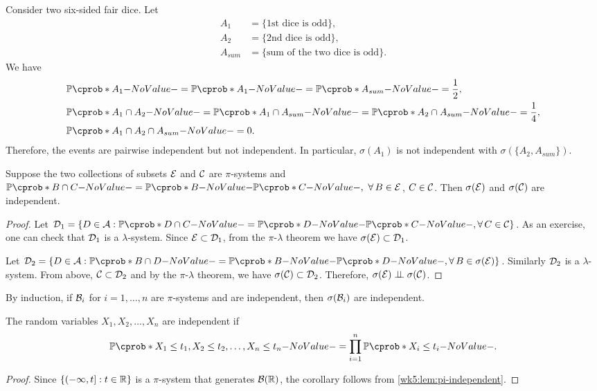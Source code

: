 \documentclass[12pt]{article}
\begin{document}
\begin{Example}\label{wk5:Independence2}
Consider two six-sided fair dice. Let
\begin{align*}
A_1 & =\{ \text{1st dice is odd} \}, \\
A_2 & =\{ \text{2nd dice is odd} \},\\
A_{sum} & =\{ \text{sum of the two dice is odd} \}.
\end{align*}
We have
\begin{align*}
&\P (A_1) =\P (A_1) =\P (A_{sum}) =\frac{1}{2},\\
&\P (A_1\cap A_2) =\P (A_1\cap A_{sum})=\P (A_2\cap A_{sum}) =\frac{1}{4},\\
&\P (A_1\cap A_2 \cap A_{sum}) =0.
\end{align*}
Therefore, the events are pairwise independent but not independent. In particular, $\sigma(A_1)$ is not independent with $\sigma(\{A_2,A_{sum}\})$.
\end{Example}

\begin{Lemma}\label{wk5:lem:pi-independent} 
Suppose the two collections of subsets $\mathcal{E}$ and $\mathcal{C}$ are $\pi$-systems and $\P(B \cap C)=\P(B) \P (C),\ \forall B \in \calE$, $C \in \mathcal{C}$. Then $\sigma (\mathcal{E})$ and $\sigma (\mathcal{C})$ are independent.
\end{Lemma}
\begin{proof}
Let $\calD_1=\{D \in \calA : \P (D\cap C)= \P(D) \P(C), \forall C \in \calC \}$. As an exercise, one can check that $\mathcal{D}_1$ is a $\lambda$-system. Since $\mathcal{E} \subset \mathcal{D}_1$, from the $\pi$-$\lambda$ theorem we have $\sigma(\mathcal{E})\subset \mathcal{D}_1$.

Let $\calD_2=\{D \in \calA : \P (B\cap D)= \P(B) \P(D), \forall B \in \sigma(\calE) \}$. Similarly $\mathcal{D}_2$ is a $\lambda$-system. From above, $\mathcal{C} \subset \mathcal{D}_2$ and by the $\pi$-$\lambda$ theorem, we have $\sigma(\mathcal{C})\subset \mathcal{D}_2$. Therefore, $\sigma (\calE) \independent \sigma (\calC)$.
\end{proof}
By induction, if $\mathcal{B}_i$ for $i=1,\ldots,n$ are $\pi$-systems and are independent, then $\sigma(\mathcal{B} _i)$ are independent.

\begin{Corollary}
The random variables $X_1,X_2,\ldots,X_n$ are independent if 
\begin{align*}
\P (X_1\leq t_1,X_2\leq t_2,\ldots, X_n\leq t_n)= \prod_{i=1}^n {\P(X_i\leq t_i)}.
\end{align*}
\end{Corollary}
\begin{proof}
Since $\{(-\infty,t]: t\in\mathbb{R}\}$ is a $\pi$-system that generates $\mathcal{B}(\mathbb{R})$, the corollary follows from \cref{wk5:lem:pi-independent}.
\end{proof}
\end{document}
